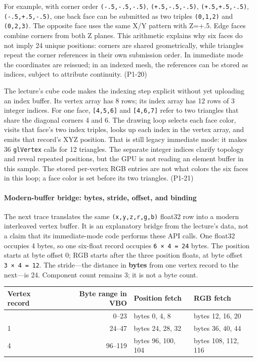 For example, with corner order \texttt{(-.5,-.5,-.5)}, \texttt{(+.5,-.5,-.5)}, \texttt{(+.5,+.5,-.5)}, \texttt{(-.5,+.5,-.5)}, one back face can be submitted as two triples \texttt{(0,1,2)} and \texttt{(0,2,3)}. The opposite face uses the same X/Y pattern with Z=+.5. Edge faces combine corners from both Z planes. This arithmetic explains why six faces do not imply 24 unique positions: corners are shared geometrically, while triangles repeat the corner references in their own submission order. In immediate mode the coordinates are reissued; in an indexed mesh, the references can be stored as indices, subject to attribute continuity. (P1-20)

The lecture's cube code makes the indexing step explicit without yet uploading an index buffer. Its vertex array has 8 rows; its index array has 12 rows of 3 integer indices. For one face, \texttt{{[}4,5,6{]}} and \texttt{{[}4,6,7{]}} refer to two triangles that share the diagonal corners 4 and 6. The drawing loop selects each face color, visits that face's two index triples, looks up each index in the vertex array, and emits that record's XYZ position. That is still legacy immediate mode: it makes 36 \texttt{glVertex} calls for 12 triangles. The separate integer indices clarify topology and reveal repeated positions, but the GPU is not reading an element buffer in this sample. The stored per-vertex RGB entries are not what colors the six faces in this loop; a face color is set before its two triangles. (P1-21)

\paragraph{Modern-buffer bridge: bytes, stride, offset, and binding}\label{modern-buffer-bridge-bytes-stride-offset-and-binding}

The next trace translates the same \texttt{(x,y,z,r,g,b)} float32 row into a modern interleaved vertex buffer. It is an explanatory bridge from the lecture's data, not a claim that its immediate-mode code performs these API calls. One float32 occupies 4 bytes, so one six-float record occupies \texttt{6\ ×\ 4\ =\ 24} bytes. The position starts at byte offset 0; RGB starts after the three position floats, at byte offset \texttt{3\ ×\ 4\ =\ 12}. The stride---the distance in \textbf{bytes} from one vertex record to the next---is 24. Component count remains 3; it is not a byte count.

{\def\LTcaptype{none} %
\begin{longtable}[]{@{}lrll@{}}
\toprule\noalign{}
Vertex record & Byte range in VBO & Position fetch & RGB fetch \\
\midrule\noalign{}
\endhead
\bottomrule\noalign{}
\endlastfoot
0 & 0--23 & bytes 0, 4, 8 & bytes 12, 16, 20 \\
1 & 24--47 & bytes 24, 28, 32 & bytes 36, 40, 44 \\
4 & 96--119 & bytes 96, 100, 104 & bytes 108, 112, 116 \\
\end{longtable}
}


